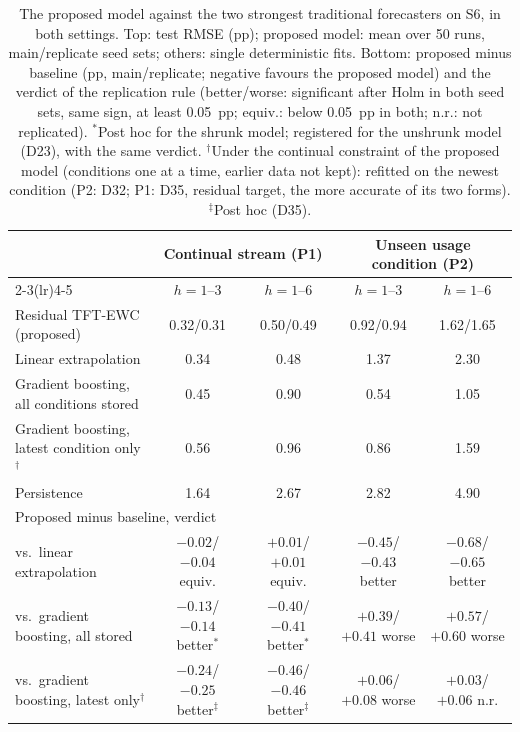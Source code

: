 \begin{table}[t]
  \centering
  \caption{The proposed model against the two strongest traditional forecasters on S6, in both settings. Top:
    test RMSE (pp); proposed model: mean over 50 runs, main/replicate seed sets; others: single deterministic fits.
    Bottom: proposed minus baseline (pp, main/replicate; negative favours the proposed model) and the
    verdict of the replication rule (better/worse: significant after Holm in both seed sets, same sign, at least
    0.05~pp; equiv.: below 0.05~pp in both; n.r.: not replicated). $^\ast$Post hoc for the shrunk model; registered
    for the unshrunk model (D23), with the same verdict. $^\dagger$Under the continual constraint of the proposed
    model (conditions one at a time, earlier data not kept): refitted on the newest condition (P2: D32; P1: D35,
    residual target, the more accurate of its two forms). $^\ddagger$Post hoc (D35).}
  \label{tab:headline}
  \setlength{\tabcolsep}{4pt}
  \footnotesize
  \begin{tabular}{lcccc}
    \toprule
    & \multicolumn{2}{c}{Continual stream (P1)} & \multicolumn{2}{c}{Unseen usage condition (P2)} \\
    \cmidrule(lr){2-3}\cmidrule(lr){4-5}
    & $h{=}1$--3 & $h{=}1$--6 & $h{=}1$--3 & $h{=}1$--6 \\
    \midrule
    Residual TFT-EWC (proposed) & 0.32/0.31 & 0.50/0.49 & 0.92/0.94 & 1.62/1.65 \\
    Linear extrapolation & 0.34 & 0.48 & 1.37 & 2.30 \\
    Gradient boosting, all conditions stored & 0.45 & 0.90 & 0.54 & 1.05 \\
    Gradient boosting, latest condition only$^\dagger$ & 0.56 & 0.96 & 0.86 & 1.59 \\
    Persistence & 1.64 & 2.67 & 2.82 & 4.90 \\
    \midrule
    \multicolumn{5}{l}{Proposed minus baseline, verdict} \\
    vs.\ linear extrapolation & $-0.02$/$-0.04$ equiv. & $+0.01$/$+0.01$ equiv. & $-0.45$/$-0.43$ better & $-0.68$/$-0.65$ better \\
    vs.\ gradient boosting, all stored & $-0.13$/$-0.14$ better$^\ast$ & $-0.40$/$-0.41$ better$^\ast$ & $+0.39$/$+0.41$ worse & $+0.57$/$+0.60$ worse \\
    vs.\ gradient boosting, latest only$^\dagger$ & $-0.24$/$-0.25$ better$^\ddagger$ & $-0.46$/$-0.46$ better$^\ddagger$ & $+0.06$/$+0.08$ worse & $+0.03$/$+0.06$ n.r. \\
    \bottomrule
  \end{tabular}
\end{table}
